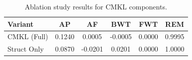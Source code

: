 \begin{table}[ht]
\centering
\caption{Ablation study results for CMKL components.}
\label{tab:ablation_results}
\begin{tabular}{lccccc}
\toprule
\textbf{Variant} & \textbf{AP} & \textbf{AF} & \textbf{BWT} & \textbf{FWT} & \textbf{REM} \\
\midrule
CMKL (Full) & 0.1240 & 0.0005 & -0.0005 & 0.0000 & 0.9995 \\
Struct Only & 0.0870 & -0.0201 & 0.0201 & 0.0000 & 1.0000 \\
\bottomrule
\end{tabular}
\end{table}
